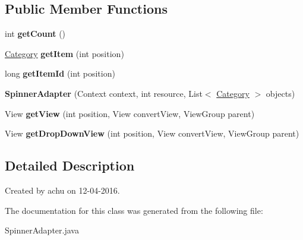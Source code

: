\subsection*{Public Member Functions}
\begin{DoxyCompactItemize}
\item 
int {\bfseries get\+Count} ()\hypertarget{classcom_1_1example_1_1sel_1_1lostfound_1_1SpinnerAdapter_a9ee3f8a3ee4642cc4379a4fc710a4484}{}\label{classcom_1_1example_1_1sel_1_1lostfound_1_1SpinnerAdapter_a9ee3f8a3ee4642cc4379a4fc710a4484}

\item 
\hyperlink{classcom_1_1example_1_1sel_1_1lostfound_1_1Category}{Category} {\bfseries get\+Item} (int position)\hypertarget{classcom_1_1example_1_1sel_1_1lostfound_1_1SpinnerAdapter_a48949a737b70991a11fe5f45e6c0b6c1}{}\label{classcom_1_1example_1_1sel_1_1lostfound_1_1SpinnerAdapter_a48949a737b70991a11fe5f45e6c0b6c1}

\item 
long {\bfseries get\+Item\+Id} (int position)\hypertarget{classcom_1_1example_1_1sel_1_1lostfound_1_1SpinnerAdapter_a248484bdf819294d3bdc8f6db635c673}{}\label{classcom_1_1example_1_1sel_1_1lostfound_1_1SpinnerAdapter_a248484bdf819294d3bdc8f6db635c673}

\item 
{\bfseries Spinner\+Adapter} (Context context, int resource, List$<$ \hyperlink{classcom_1_1example_1_1sel_1_1lostfound_1_1Category}{Category} $>$ objects)\hypertarget{classcom_1_1example_1_1sel_1_1lostfound_1_1SpinnerAdapter_a9cbc724bbe142a941090cc9bf5b8bcb6}{}\label{classcom_1_1example_1_1sel_1_1lostfound_1_1SpinnerAdapter_a9cbc724bbe142a941090cc9bf5b8bcb6}

\item 
View {\bfseries get\+View} (int position, View convert\+View, View\+Group parent)\hypertarget{classcom_1_1example_1_1sel_1_1lostfound_1_1SpinnerAdapter_ac19132459aeaef196c367a156bb03e0e}{}\label{classcom_1_1example_1_1sel_1_1lostfound_1_1SpinnerAdapter_ac19132459aeaef196c367a156bb03e0e}

\item 
View {\bfseries get\+Drop\+Down\+View} (int position, View convert\+View, View\+Group parent)\hypertarget{classcom_1_1example_1_1sel_1_1lostfound_1_1SpinnerAdapter_a338cec7659aa976e986e4d1c843d4041}{}\label{classcom_1_1example_1_1sel_1_1lostfound_1_1SpinnerAdapter_a338cec7659aa976e986e4d1c843d4041}

\end{DoxyCompactItemize}


\subsection{Detailed Description}
Created by achu on 12-\/04-\/2016. 

The documentation for this class was generated from the following file\+:\begin{DoxyCompactItemize}
\item 
Spinner\+Adapter.\+java\end{DoxyCompactItemize}
